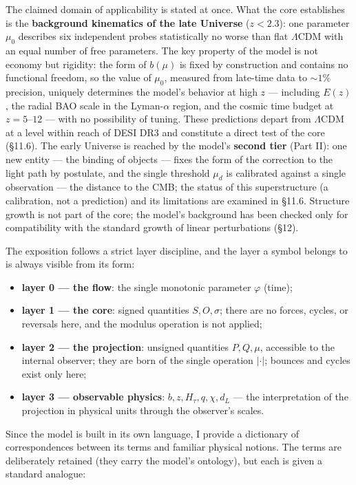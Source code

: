 \documentclass{article}
\begin{document}
The claimed domain of applicability is stated at once. What the core establishes is the \textbf{background kinematics of the late Universe} ($z < 2.3$): one parameter $\mu_0$ describes six independent probes statistically no worse than flat $\Lambda$CDM with an equal number of free parameters. The key property of the model is not economy but rigidity: the form of $b(\mu)$ is fixed by construction and contains no functional freedom, so the value of $\mu_0$, measured from late-time data to ${\sim}1\%$ precision, uniquely determines the model's behavior at high $z$ --- including $E(z)$, the radial BAO scale in the Lyman-$\alpha$ region, and the cosmic time budget at $z = 5\text{--}12$ --- with no possibility of tuning. These predictions depart from $\Lambda$CDM at a level within reach of DESI DR3 and constitute a direct test of the core (\S11.6). The early Universe is reached by the model's \textbf{second tier} (Part II): one new entity --- the binding of objects --- fixes the form of the correction to the light path by postulate, and the single threshold $\mu_d$ is calibrated against a single observation --- the distance to the CMB; the status of this superstructure (a calibration, not a prediction) and its limitations are examined in \S11.6. Structure growth is not part of the core; the model's background has been checked only for compatibility with the standard growth of linear perturbations (\S12).

The exposition follows a strict layer discipline, and the layer a symbol belongs to is always visible from its form:
\begin{itemize}
  \item \textbf{layer 0 --- the flow}: the single monotonic parameter $\varphi$ (time);
  \item \textbf{layer 1 --- the core}: signed quantities $S, O, \sigma$; there are no forces, cycles, or reversals here, and the modulus operation is not applied;
  \item \textbf{layer 2 --- the projection}: unsigned quantities $P, Q, \mu$, accessible to the internal observer; they are born of the single operation $|\cdot|$; bounces and cycles exist only here;
  \item \textbf{layer 3 --- observable physics}: $b, z, H_\tau, q, \chi, d_L$ --- the interpretation of the projection in physical units through the observer's scales.
\end{itemize}

Since the model is built in its own language, I provide a dictionary of correspondences between its terms and familiar physical notions. The terms are deliberately retained (they carry the model's ontology), but each is given a standard analogue:
\end{document}
